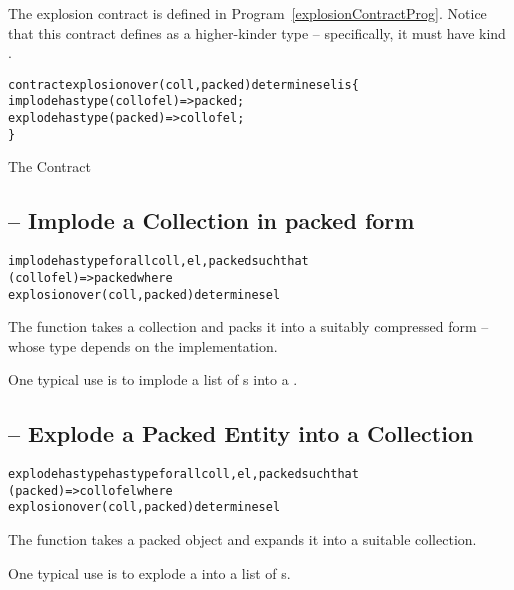 The explosion contract is defined in Program~\vref{explosionContractProg}. Notice that this contract defines  as a higher-kinder type -- specifically, it must have kind .

\begin{program}[H]
\begin{alltt}
contract explosion over (coll,packed) determines el is \{
  implode has type (coll of el)=>packed;
  explode has type (packed) => coll of el;
\}
\end{alltt}
\caption{The  Contract\label{explosionContractProg}}
\end{program}

\subsection{ -- Implode a Collection in packed form}
\label{implodeFunction}

\begin{alltt}
implode has type for all coll, el, packed such that 
  (coll of el)=>packed where
    explosion over (coll,packed) determines el
\end{alltt}

\noindent
The  function takes a collection and packs it into a suitably compressed form -- whose type depends on the implementation.

\begin{aside}
One typical use is to implode a  list of s into a .\end{aside}

\subsection{ -- Explode a Packed Entity into a Collection}
\label{explodeFunction}

\begin{alltt}
explode has type has type for all coll, el, packed such that 
  (packed) => coll of el where
    explosion over (coll,packed) determines el
\end{alltt}

\noindent
The  function takes a packed object and expands it into a suitable collection.

\begin{aside}
One typical use is to explode a  into a  list of s.\end{aside}

